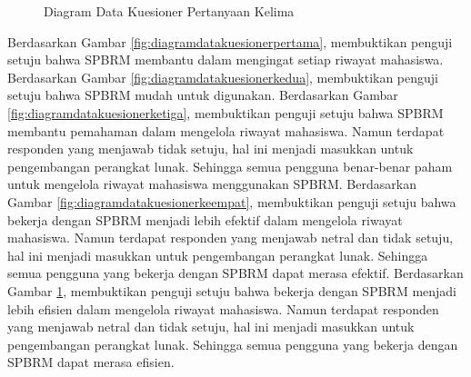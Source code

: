 \begin{figure}[p]
\centering
{}
\caption[Diagram Data Kuesioner Pertanyaan Kelima]{Diagram Data Kuesioner Pertanyaan Kelima}
\label{fig:diagramdatakuesionerkelima}
\end{figure}

Berdasarkan Gambar \ref{fig:diagramdatakuesionerpertama}, membuktikan penguji setuju bahwa SPBRM membantu dalam mengingat setiap riwayat mahasiswa. Berdasarkan Gambar \ref{fig:diagramdatakuesionerkedua}, membuktikan penguji setuju bahwa SPBRM mudah untuk digunakan. Berdasarkan Gambar \ref{fig:diagramdatakuesionerketiga}, membuktikan penguji setuju bahwa SPBRM membantu pemahaman dalam mengelola riwayat mahasiswa. Namun terdapat responden yang menjawab tidak setuju, hal ini menjadi masukkan untuk pengembangan perangkat lunak. Sehingga semua pengguna benar-benar paham untuk mengelola riwayat mahasiswa menggunakan SPBRM. Berdasarkan Gambar \ref{fig:diagramdatakuesionerkeempat}, membuktikan penguji setuju bahwa bekerja dengan SPBRM menjadi lebih efektif dalam mengelola riwayat mahasiswa. Namun terdapat responden yang menjawab netral dan tidak setuju, hal ini menjadi masukkan untuk pengembangan perangkat lunak. Sehingga semua pengguna yang bekerja dengan SPBRM dapat merasa efektif. Berdasarkan Gambar \ref{fig:diagramdatakuesionerkelima}, membuktikan penguji setuju bahwa bekerja dengan SPBRM menjadi lebih efisien dalam mengelola riwayat mahasiswa. Namun terdapat responden yang menjawab netral dan tidak setuju, hal ini menjadi masukkan untuk pengembangan perangkat lunak. Sehingga semua pengguna yang bekerja dengan SPBRM dapat merasa efisien.

